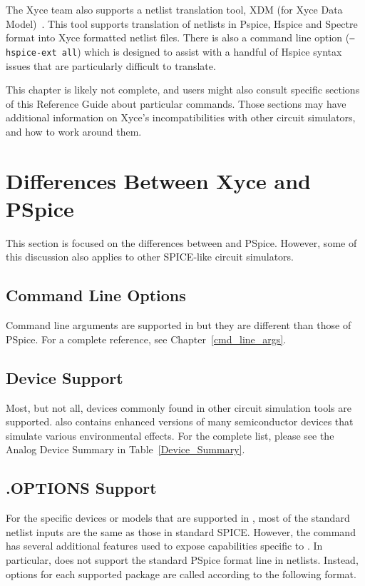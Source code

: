 The Xyce team also supports a netlist translation tool, XDM (for Xyce Data 
Model)~\XDMGuide{}.  This tool supports translation of netlists in Pspice, 
Hspice and Spectre format into Xyce formatted netlist files.  There is also a 
\Xyce{} command line option (\texttt{--hspice-ext all}) which is designed to 
assist with a handful of Hspice syntax issues that are particularly 
difficult to translate.

This chapter is likely not complete, and \Xyce{} users might also consult
specific sections of this Reference Guide about particular \Xyce{} commands.
Those sections may have additional information on Xyce's incompatibilities with
other circuit simulators, and how to work around them.  
\section{Differences Between Xyce and PSpice}
This section is focused on the differences between \Xyce{} and PSpice.
However, some of this discussion also applies to other SPICE-like
circuit simulators. 

\subsection{Command Line Options}
Command line arguments are supported in \Xyce{} but they are different than
those of PSpice.   For a complete reference, see Chapter~\ref{cmd_line_args}. 

\subsection{Device Support}
Most, but not all, devices commonly found in other
circuit simulation tools are supported.  \Xyce{} also contains enhanced versions of
many semiconductor devices that simulate various environmental effects.  For the
complete list, please see the
Analog Device Summary in Table~\ref{Device_Summary}.

\subsection{ .OPTIONS Support}
For the specific devices or models that are supported in \Xyce{}, most of the
standard netlist inputs are the same as those in standard SPICE.
However, the  command has several additional features used to
expose capabilities specific to \Xyce{}.  In particular, \Xyce{} does not
support the standard PSpice format  line in netlists.
Instead, options for each supported package are called according to the
following format.

